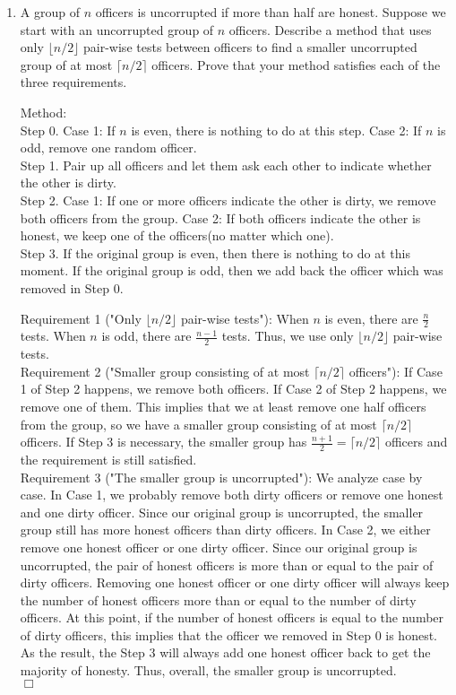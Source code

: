 \documentclass[10pt]{article}
\newenvironment{proof}{\par\noindent{\it Proof.}\hspace*{1em}}{$\Box$\bigskip}
\begin{document}
\begin{enumerate}
    \item A group of $n$ officers is uncorrupted if more than half are honest. Suppose we start with an uncorrupted group of $n$ officers. Describe a method that uses only $\lfloor n/2 \rfloor$ pair-wise tests between officers to find a smaller uncorrupted group of at most $\lceil n/2 \rceil$ officers. Prove that your method satisfies each of the three requirements.
    
    Method: \\
    Step 0. Case 1: If $n$ is even, there is nothing to do at this step.
    Case 2: If $n$ is odd, remove one random officer. \\
    Step 1. Pair up all officers and let them ask each other to indicate whether the other is dirty. \\
    Step 2. Case 1: If one or more officers indicate the other is dirty, we remove both officers from the group. Case 2: If both officers indicate the other is honest, we keep one of the officers(no matter which one).\\
    Step 3. If the original group is even, then there is nothing to do at this moment. If the original group is odd, then we add back the officer which was removed in Step 0. 
    \begin{proof}
    Requirement 1 ("Only $\lfloor n/2 \rfloor$ pair-wise tests"): When $n$ is even, there are $\frac {n}{2}$ tests. When $n$ is odd, there are $\frac {n-1}{2}$ tests. Thus, we use only $\lfloor n/2 \rfloor$ pair-wise tests.\\
    Requirement 2 ("Smaller group consisting of at most $\lceil n/2 \rceil$ officers"): If Case 1 of Step 2 happens, we remove both officers. If Case 2 of Step 2 happens, we remove one of them. This implies that we at least remove one half officers from the group, so we have a smaller group consisting of at most $\lceil n/2 \rceil$ officers. If Step 3 is necessary, the smaller group has $\frac{n+1}{2}=\lceil n/2 \rceil$ officers and the requirement is still satisfied.\\
    Requirement 3 ("The smaller group is uncorrupted"): We analyze case by case. In Case 1, we probably remove both dirty officers or remove one honest and one dirty officer. Since our original group is uncorrupted, the smaller group still has more honest officers than dirty officers. In Case 2, we either remove one honest officer or one dirty officer. Since our original group is uncorrupted, the pair of honest officers is more than or equal to the pair of dirty officers. Removing one honest officer or one dirty officer will always keep the number of honest officers more than or equal to the number of dirty officers. At this point, if the number of honest officers is equal to the number of dirty officers, this implies that the officer we removed in Step 0 is honest. As the result, the Step 3 will always add one honest officer back to get the majority of honesty. Thus, overall, the smaller group is uncorrupted.\\
    \end{proof}


\end{enumerate}
\end{document}
